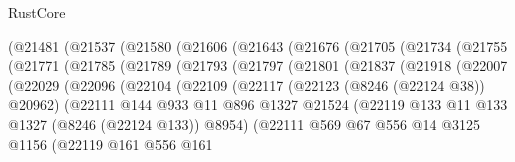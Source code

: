 \begin{lexlean}{RustCore}
\begin{coremodule}
          (@21481
            (@21537
              (@21580
                (@21606
                  (@21643
                    (@21676
                      (@21705
                        (@21734
                          (@21755
                            (@21771
                              (@21785
                                (@21789
                                  (@21793
                                    (@21797
                                      (@21801
                                        (@21837
                                          (@21918
                                            (@22007
                                              (@22029
                                                (@22096
                                                  (@22104
                                                    (@22109
                                                      (@22117
                                                        (@22123 (@8246 (@22124 @38)) @20962)
                                                        (@22111
                                                          @144
                                                          @933
                                                          @11
                                                          @896
                                                          @1327
                                                          @21524
                                                          (@22119
                                                            @133
                                                            @11
                                                            @133
                                                            @1327
                                                            (@8246 (@22124 @133))
                                                            @8954)
                                                          (@22111
                                                            @569
                                                            @67
                                                            @556
                                                            @14
                                                            @3125
                                                            @1156
                                                            (@22119
                                                              @161
                                                              @556
                                                              @161

\end{coremodule}
\end{lexlean}
